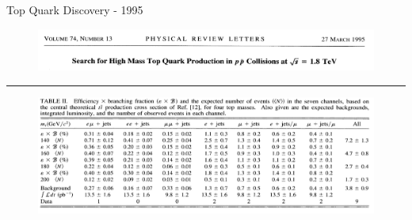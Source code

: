 \documentclass{beamer}
\begin{document}
\begin{frame}{Top Quark Discovery \-- 1995}
  \begin{figure}
    \includegraphics[width=\textwidth]{figures/Top_Quark_Discovery_1.png}
  \end{figure}
  \hrule
  \begin{figure}
    \includegraphics[width=\textwidth]{figures/Top_Quark_Discovery_2.png}
  \end{figure}
\end{frame}
\end{document}
